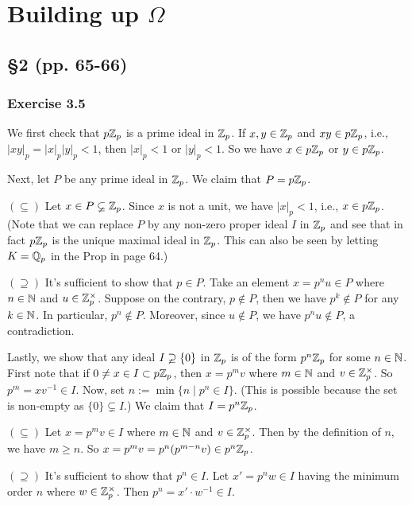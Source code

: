 \documentclass[../Koblitz.tex]{subfiles}
\begin{document}
\chapter{Building up \texorpdfstring{$\Omega$}{Omega}}

\section*{\S2 (pp. 65-66)}

\subsection*{Exercise 3.5}

We first check that $p\mathbb{Z}_p$ is a prime ideal in $\mathbb{Z}_p$. If $x,y\in\mathbb{Z}_p$ and $xy\in p\mathbb{Z}_p$, i.e., $|xy|_p=|x|_p|y|_p<1$, then $|x|_p<1$ or $|y|_p<1$. So we have $x\in p\mathbb{Z}_p$ or $y\in p\mathbb{Z}_p$.

Next, let $P$ be any prime ideal in $\mathbb{Z}_p$. We claim that $P=p\mathbb{Z}_p$. 

$(\subseteq)$ Let $x\in P\varsubsetneq\mathbb{Z}_p$. Since $x$ is not a unit, we have $|x|_p<1$, i.e., $x\in p\mathbb{Z}_p$. (Note that we can replace $P$ by any non-zero proper ideal $I$ in $\mathbb{Z}_p$ and see that in fact $p\mathbb{Z}_p$ is the unique maximal ideal in $\mathbb{Z}_p$. This can also be seen by letting $K=\mathbb{Q}_p$ in the Prop in page 64.)

$(\supseteq)$ It's sufficient to show that $p\in P$. Take an element $x=p^nu\in P$ where $n\in\mathbb{N}$ and $u\in\mathbb{Z}_p^\times$. Suppose on the contrary, $p\not\in P$, then we have $p^k\not\in P$ for any $k\in\mathbb{N}$. In particular, $p^n\not\in P$. Moreover, since $u\not\in P$, we have $p^nu\not\in P$, a contradiction.

Lastly, we show that any ideal $I\varsupsetneq \{0\}$ in $\mathbb{Z}_p$ is of the form $p^n\mathbb{Z}_p$ for some $n\in\mathbb{N}$. First note that if $0\neq x\in I\subset p\mathbb{Z}_p$, then $x=p^mv$ where $m\in\mathbb{N}$ and $v\in\mathbb{Z}_p^\times$. So $p^m=xv^{-1}\in I$. Now, set $n:=\min \{n\mid p^n\in I\}$. (This is possible because the set is non-empty as $\{0\}\varsubsetneq I$.) We claim that $I=p^n\mathbb{Z}_p$.

$(\subseteq)$ Let $x=p^mv\in I$ where $m\in\mathbb{N}$ and $v\in\mathbb{Z}_p^\times$. Then by the definition of $n$, we have $m\geq n$. So $x=p^mv=p^n(p^{m-n}v)\in p^n\mathbb{Z}_p$.

$(\supseteq)$ It's sufficient to show that $p^n\in I$. Let $x'=p^nw\in I$ having the minimum order $n$ where $w\in\mathbb{Z}_p^\times$. Then $p^n=x'\cdot w^{-1}\in I$.
\end{document}
